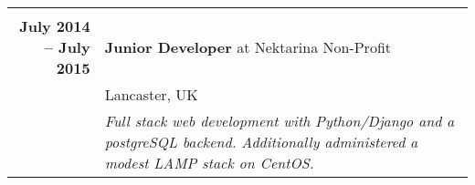\documentclass[a4paper,10pt]{article} %
\begin{document}
\begin{tabularx}{\textwidth}{r|X}
\multicolumn{2}{r}{} \\ %

\textbf{July 2014 -- July 2015}    & \textbf{Junior Developer} at {Nektarina Non-Profit}\\
                                   & Lancaster, UK\\
                                   & \footnotesize\emph{Full stack web development with Python/Django and a postgreSQL backend. Additionally administered a modest LAMP stack on CentOS.}\\

\end{tabularx}

\end{document}

